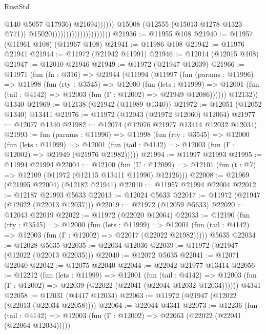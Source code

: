 \begin{lexlean}{RustStd}
\begin{coremodule}
                                                            @140
                                                            @5057
                                                            @17936)
                                                          @21694))))))
                                              @15008
                                              (@12555 (@15013 @1278 @1323 @771))
                                              @15020)))))))))))))))))))))
@21936 := @11955 @108
@21940 := @11957 (@11961 @108) (@11967 @108)
@21941 := @11986 @108
@21942 := @11976 @21941
@21944 := @11972 (@21942 @11991)
@21946 := @12014 (@12015 @108)
@21947 := @12010 @21946
@21949 := @11972 (@21947 @12039)
@21966 := @11971
    (fun (fn : @316) =>
    @21944
      (@11994
        (@11997
          (fun (params : @11996) =>
          @11998
            (fun (rty : @3545) =>
            @12000
              (fun (lets : @11999) =>
              @12001 (fun (tail : @4142) => @12003 (fun (Γ : @12002) => @21949 @12086))))))
        @12132))
    @1340
@21969 := @12138 (@21942 (@11989 @1340))
@21972 := @12051 (@12052 @1340) @13411
@21976 := @11972 (@12043 (@21972 @12060) @12064)
@21977 := @12077 @1340
@21982 := @12074 (@12076 @21977 @13414 @12032 @12034)
@21993 := fun (params : @11996) =>
  @11998
    (fun (rty : @3545) =>
    @12000
      (fun (lets : @11999) =>
      @12001 (fun (tail : @4142) => @12003 (fun (Γ : @12002) => @21949 (@21976 @21982)))))
@21994 := @11997 @21993
@21995 := @11994 @21994
@22004 := @12100
    (fun (U : @12099) => @12101 (fun (t : @7) => @12109 (@11972 (@12115 @13411 @11990) @12126)))
@22008 := @21969 (@21995 @22004) (@12182 @21941)
@22010 := @11957 @21994 @22004
@22012 := @12187 @21993 @5633
@22013 := @12024 @5633
@22017 := @11972 (@21947 (@12022 (@22013 @12037)))
@22019 := @21972 (@12059 @5633)
@22020 := @12043 @22019
@22022 := @11972 (@22020 @12064)
@22033 := @12190
    (fun (rty : @3545) =>
    @12000
      (fun (lets : @11999) =>
      @12001 (fun (tail : @4142) => @12003 (fun (Γ : @12002) => @22017 (@22022 @21982)))))
    @5635
@22034 := @12028 @5635
@22035 := @22034 @12036
@22039 := @11972 (@21947 (@12022 (@22013 @22035)))
@22040 := @12072 @5635
@22041 := @12071 @22040
@22042 := @12075 @22040
@22044 := @22042 @21977 @13414
@22056 := @12212
    (fun (lets : @11999) =>
    @12001
      (fun (tail : @4142) =>
      @12003 (fun (Γ : @12002) => @22039 (@22022 (@22041 (@22044 @12032 @12034))))))
    @4341
@22058 := @12031 (@4417 @12034)
@22063 := @11972 (@21947 (@12022 (@22013 (@22034 @22058))))
@22064 := @22044 @4341
@22073 := @12236
    (fun (tail : @4142) => @12003 (fun (Γ : @12002) => @22063 (@22022 (@22041 (@22064 @12034)))))

\end{coremodule}
\end{lexlean}
